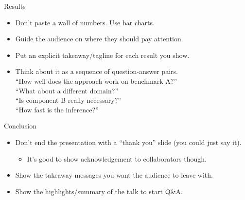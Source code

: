 \documentclass[usenames,dvipsnames,notes]{beamer}
\begin{document}
\begin{frame}
    {Results}
    \begin{itemize}
        \item Don't paste a wall of numbers. Use bar charts.
        \item Guide the audience on where they should pay attention.
        \item Put an explicit takeaway/tagline for each result you show.
        \item Think about it as a sequence of question-answer pairs.\\
            ``How well does the approach work on benchmark A?''\\
            ``What about a different domain?''\\
            ``Is component B really necessary?''\\
            ``How fast is the inference?''
    \end{itemize}
\end{frame}

\begin{frame}
    {Conclusion}
    \begin{itemize}
        \item Don't end the presentation with a ``thank you'' slide (you could just say it).
            \begin{itemize}
                \item It's good to show acknowledgement to collaborators though.
            \end{itemize}
        \item Show the takeaway messages you want the audience to leave with.
        \item Show the highlights/summary of the talk to start Q\&A. 
    \end{itemize}
\end{frame}
\end{document}
